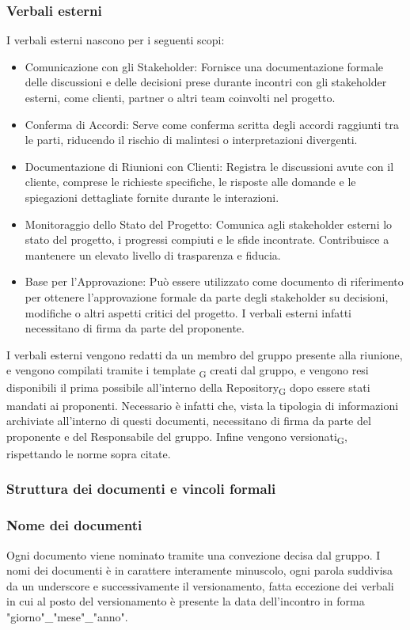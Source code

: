 \documentclass{article}
\begin{document}
\subsubsection{Verbali esterni}
I verbali esterni nascono per i seguenti scopi:
\begin{itemize}
    \item Comunicazione con gli Stakeholder: Fornisce una documentazione formale delle discussioni e delle decisioni prese durante incontri con gli stakeholder esterni, come clienti, partner o altri team coinvolti nel progetto.
    \item Conferma di Accordi: Serve come conferma scritta degli accordi raggiunti tra le parti, riducendo il rischio di malintesi o interpretazioni divergenti.
    \item Documentazione di Riunioni con Clienti: Registra le discussioni avute con il cliente, comprese le richieste specifiche, le risposte alle domande e le spiegazioni dettagliate fornite durante le interazioni.
    \item Monitoraggio dello Stato del Progetto: Comunica agli stakeholder esterni lo stato del progetto, i progressi compiuti e le sfide incontrate. Contribuisce a mantenere un elevato livello di trasparenza e fiducia.
    \item Base per l'Approvazione: Può essere utilizzato come documento di riferimento per ottenere l'approvazione formale da parte degli stakeholder su decisioni, modifiche o altri aspetti critici del progetto. I verbali esterni infatti necessitano di firma da parte del proponente.
\end{itemize}

I verbali esterni vengono redatti da un membro del gruppo presente alla riunione, e vengono compilati tramite i template \textsubscript{G} creati dal gruppo, e vengono resi disponibili il prima possibile all'interno della Repository\textsubscript{G} dopo essere stati mandati ai proponenti. Necessario è infatti che, vista la tipologia di informazioni archiviate all'interno di questi documenti, necessitano di firma da parte del proponente e del Responsabile del gruppo. Infine vengono versionati\textsubscript{G}, rispettando le norme sopra citate.

\subsubsection{Struttura dei documenti e vincoli formali}
\subsubsection*{Nome dei documenti}
Ogni documento viene nominato tramite una convezione decisa dal gruppo. I nomi dei documenti è in carattere interamente minuscolo, ogni parola suddivisa da un underscore e successivamente il versionamento, fatta eccezione dei verbali in cui al posto del versionamento è presente la data dell'incontro in forma "giorno"\_"mese"\_"anno".
\end{document}
